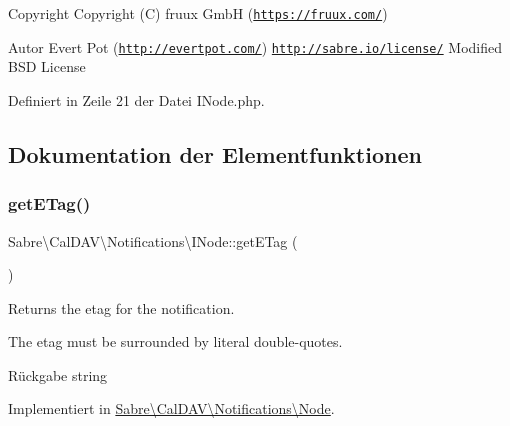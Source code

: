 \begin{DoxyCopyright}{Copyright}
Copyright (C) fruux GmbH (\href{https://fruux.com/}{\tt https\+://fruux.\+com/}) 
\end{DoxyCopyright}
\begin{DoxyAuthor}{Autor}
Evert Pot (\href{http://evertpot.com/}{\tt http\+://evertpot.\+com/})  \href{http://sabre.io/license/}{\tt http\+://sabre.\+io/license/} Modified B\+SD License 
\end{DoxyAuthor}


Definiert in Zeile 21 der Datei I\+Node.\+php.



\subsection{Dokumentation der Elementfunktionen}
\mbox{\label{interface_sabre_1_1_cal_d_a_v_1_1_notifications_1_1_i_node_a8c63b58470da3dd3c3f1088e3f6effc9}} 
\subsubsection{\texorpdfstring{get\+E\+Tag()}{getETag()}}
{\footnotesize\ttfamily Sabre\textbackslash{}\+Cal\+D\+A\+V\textbackslash{}\+Notifications\textbackslash{}\+I\+Node\+::get\+E\+Tag (\begin{DoxyParamCaption}{ }\end{DoxyParamCaption})}

Returns the etag for the notification.

The etag must be surrounded by literal double-\/quotes.

\begin{DoxyReturn}{Rückgabe}
string 
\end{DoxyReturn}


Implementiert in \mbox{\hyperlink{class_sabre_1_1_cal_d_a_v_1_1_notifications_1_1_node_adc6fffcad09368941ba2f17fd4273846}{Sabre\textbackslash{}\+Cal\+D\+A\+V\textbackslash{}\+Notifications\textbackslash{}\+Node}}.

\mbox{\label{interface_sabre_1_1_cal_d_a_v_1_1_notifications_1_1_i_node_a0d1bdc2aa548290053019ed0f30c7dcf}} 
